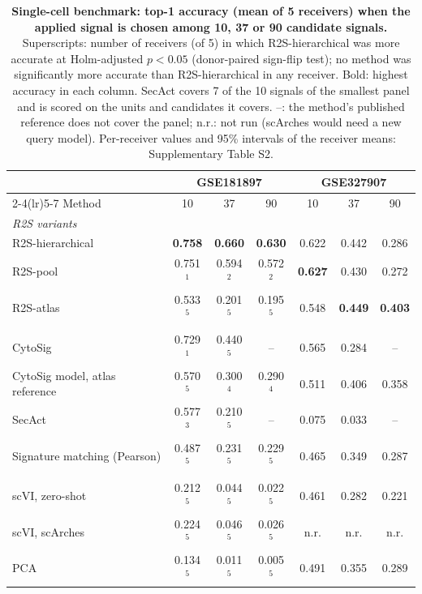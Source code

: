 \begin{table}[!ht]
\centering
\caption{\textbf{Single-cell benchmark: top-1 accuracy (mean of 5 receivers) when the applied signal is chosen among 10, 37 or 90 candidate signals.} Superscripts: number of receivers (of 5) in which R2S-hierarchical was more accurate at Holm-adjusted $p<0.05$ (donor-paired sign-flip test); no method was significantly more accurate than R2S-hierarchical in any receiver. Bold: highest accuracy in each column. SecAct covers 7 of the 10 signals of the smallest panel and is scored on the units and candidates it covers. --: the method's published reference does not cover the panel; n.r.: not run (scArches would need a new query model). Per-receiver values and 95\% intervals of the receiver means: Supplementary Table S2.}
\label{tab:singlecell}
\small
\begin{tabular}{lcccccc}
\toprule
 & \multicolumn{3}{c}{GSE181897} & \multicolumn{3}{c}{GSE327907} \\
\cmidrule(lr){2-4}\cmidrule(lr){5-7}
Method & 10 & 37 & 90 & 10 & 37 & 90 \\
\midrule
\multicolumn{7}{l}{\emph{R2S variants}} \\
R2S-hierarchical & \textbf{0.758} & \textbf{0.660} & \textbf{0.630} & 0.622 & 0.442 & 0.286 \\
R2S-pool & 0.751$^{1}$ & 0.594$^{2}$ & 0.572$^{2}$ & \textbf{0.627} & 0.430 & 0.272 \\
R2S-atlas & 0.533$^{5}$ & 0.201$^{5}$ & 0.195$^{5}$ & 0.548 & \textbf{0.449} & \textbf{0.403} \\
\addlinespace
\multicolumn{7}{l}{\emph{Signature-based methods}} \\
CytoSig & 0.729$^{1}$ & 0.440$^{5}$ & -- & 0.565 & 0.284 & -- \\
CytoSig model, atlas reference & 0.570$^{5}$ & 0.300$^{4}$ & 0.290$^{4}$ & 0.511 & 0.406 & 0.358 \\
SecAct & 0.577$^{3}$ & 0.210$^{5}$ & -- & 0.075 & 0.033 & -- \\
Signature matching (Pearson) & 0.487$^{5}$ & 0.231$^{5}$ & 0.229$^{5}$ & 0.465 & 0.349 & 0.287 \\
\addlinespace
\multicolumn{7}{l}{\emph{Embedding-based classifiers}} \\
scVI, zero-shot & 0.212$^{5}$ & 0.044$^{5}$ & 0.022$^{5}$ & 0.461 & 0.282 & 0.221 \\
scVI, scArches & 0.224$^{5}$ & 0.046$^{5}$ & 0.026$^{5}$ & n.r. & n.r. & n.r. \\
PCA & 0.134$^{5}$ & 0.011$^{5}$ & 0.005$^{5}$ & 0.491 & 0.355 & 0.289 \\

\end{tabular}
\end{table}
